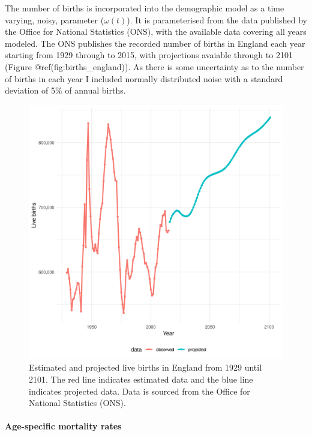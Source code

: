 \documentclass[11pt,twoside]{bristolthesis}
\begin{document}
  The number of births is incorporated into the demographic model as a time varying, noisy, parameter (\(\omega(t)\)). It is parameterised from the data published by the Office for National Statistics (ONS), with the available data covering all years modeled. The ONS publishes the recorded number of births in England each year starting from 1929 through to 2015, with projections avaiable through to 2101 (Figure @ref(fig:births\_england)). As there is some uncertainty as to the number of births in each year I included normally distributed noise with a standard deviation of 5\% of annual births.
  \begin{figure}
  
  {\centering \includegraphics[width=0.8\linewidth]{chapters/model-development/resources/figure/births} 
  
  }
  
  \caption{Estimated and projected live births in England from 1929 until 2101. The red line indicates estimated data and the blue line indicates projected data. Data is sourced from the Office for National Statistics (ONS).}\label{fig:births-england}
  \end{figure}
  \hypertarget{age-specific-mortality-rates}{%
  \paragraph{Age-specific mortality rates}\label{age-specific-mortality-rates}}
  
\end{document}
